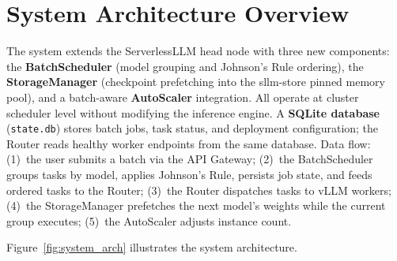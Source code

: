 \documentclass[logo,bsc,singlespacing,parskip,online]{infthesis}
\begin{document}
\section{System Architecture Overview}

The system extends the ServerlessLLM head node with three new components: the \textbf{BatchScheduler} (model grouping and Johnson's Rule ordering), the \textbf{StorageManager} (checkpoint prefetching into the sllm-store pinned memory pool), and a batch-aware \textbf{AutoScaler} integration. All operate at cluster scheduler level without modifying the inference engine. A \textbf{SQLite database} (\texttt{state.db}) stores batch jobs, task status, and deployment configuration; the Router reads healthy worker endpoints from the same database. Data flow: (1)~the user submits a batch via the API Gateway; (2)~the BatchScheduler groups tasks by model, applies Johnson's Rule, persists job state, and feeds ordered tasks to the Router; (3)~the Router dispatches tasks to vLLM workers; (4)~the StorageManager prefetches the next model's weights while the current group executes; (5)~the AutoScaler adjusts instance count.

Figure~\ref{fig:system_arch} illustrates the system architecture.
\end{document}
